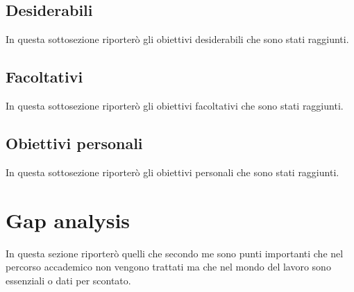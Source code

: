 \subsection{Desiderabili}
In questa sottosezione riporterò gli obiettivi desiderabili che sono stati raggiunti.

\subsection{Facoltativi}
In questa sottosezione riporterò gli obiettivi facoltativi che sono stati raggiunti.

\subsection{Obiettivi personali}
In questa sottosezione riporterò gli obiettivi personali che sono stati raggiunti.

\section{Gap analysis}
In questa sezione riporterò quelli che secondo me sono punti importanti che nel percorso accademico non vengono trattati ma che nel mondo del lavoro sono essenziali o dati per scontato.